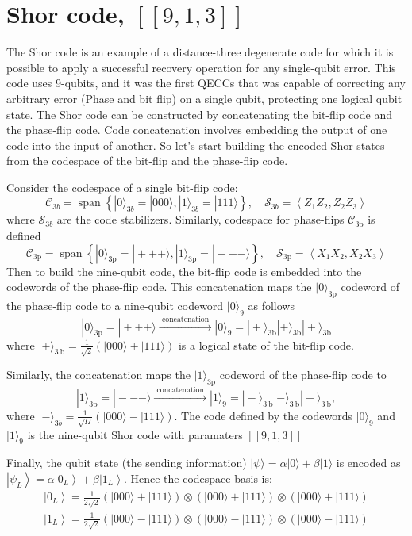 \section{Shor code, $[[9,1,3]]$}
The Shor code is an example of a distance-three degenerate code for which it is possible to apply a successful recovery operation for any single-qubit error. This code uses 9-qubits, and it was the first QECCs that was capable of correcting any arbitrary error (Phase and bit flip) on a single qubit, protecting one logical qubit state.
The Shor code can be constructed by concatenating the bit-flip code and the phase-flip code. 
Code concatenation involves embedding the output of one code into the input of another.
So let's start building the encoded Shor states from the codespace of the bit-flip and the phase-flip code. 

Consider the codespace of a single bit-flip code: 
$$
\mathcal{C}_{3b}=\operatorname{span}\left\{|0\rangle_{3b}=|000\rangle,|1\rangle_{3 b}=|111\rangle\right\}, \quad \mathcal{S}_{3 b}=\left\langle Z_{1} Z_{2}, Z_{2} Z_{3}\right\rangle
$$
where $\mathcal{S}_{3b}$ are the code stabilizers. Similarly, codespace for phase-flips $\mathcal{C}_{3 \mathrm{p}}$ is defined
$$
\mathcal{C}_{3 \mathrm{p}}=\operatorname{span}\left\{|0\rangle_{3 \mathrm{p}}=|+++\rangle,|1\rangle_{3 \mathrm{p}}=|---\rangle\right\}, \quad \mathcal{S}_{3 \mathrm{p}}=\left\langle X_{1} X_{2}, X_{2} X_{3}\right\rangle
$$
Then to build the nine-qubit code, the bit-flip code is embedded into the codewords of the phase-flip code. This concatenation maps the $|0\rangle_{3 \mathrm{p}}$ codeword of the phase-flip code to a nine-qubit codeword $|0\rangle_{9}$ as follows
$$
|0\rangle_{3 \mathrm{p}}=|+++\rangle \stackrel{\text { concatenation }}{\longrightarrow}|0\rangle_{9}=|+\rangle_{3 \mathrm{b}}|+\rangle_{3 \mathrm{b}}|+\rangle_{3 \mathrm{b}}
$$
where $|+\rangle_{3 \mathrm{~b}}=\frac{1}{\sqrt{2}}(|000\rangle+|111\rangle)$ is a logical state of the bit-flip code. 

Similarly, the concatenation maps the $|1\rangle_{3 \mathrm{p}}$ codeword of the phase-flip code to
$$
|1\rangle_{3 \mathrm{p}}=|---\rangle \stackrel{\text { concatenation }}{\longrightarrow}|1\rangle_{9}=|-\rangle_{3 \mathrm{~b}}|-\rangle_{3 \mathrm{~b}}|-\rangle_{3 \mathrm{~b}},
$$
where $|-\rangle_{3b}=\frac{1}{\sqrt{\Omega}}(|000\rangle-|111\rangle)$. The code defined by the codewords $|0\rangle_{9}$ and $|1\rangle_{9}$ is the nine-qubit Shor code with paramaters $[[9, 1, 3]]$


Finally, the qubit state (the sending information) $|\psi\rangle=\alpha|0\rangle+\beta|1\rangle$ is encoded as $\left|\psi_{L}\right\rangle=\alpha\left|0_{L}\right\rangle+\beta\left|1_{L}\right\rangle$. Hence the codespace basis is: 
\begin{equation*}
\begin{split}
\left|0_{L}\right\rangle=\frac{1}{2 \sqrt{2}}(|000\rangle +|111\rangle) \otimes(|000\rangle +|111\rangle) \otimes(|000\rangle +|111\rangle) \\
\left|1_{L}\right\rangle=\frac{1}{2 \sqrt{2}}(|000\rangle -|111\rangle) \otimes(|000\rangle -|111\rangle) \otimes(|000\rangle -|111\rangle) 
\end{split}
\end{equation*}

